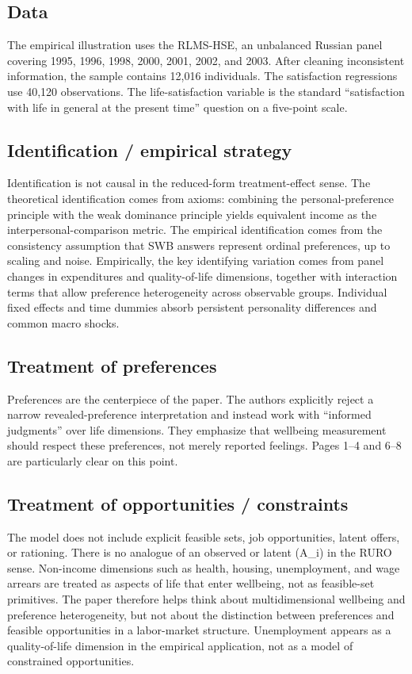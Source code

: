 \documentclass[11pt,a4paper]{article}
\begin{document}
\subsection*{Data}
The empirical illustration uses the RLMS-HSE, an unbalanced Russian panel covering 1995, 1996, 1998, 2000, 2001, 2002, and 2003. After cleaning inconsistent information, the sample contains 12,016 individuals. The satisfaction regressions use 40,120 observations. The life-satisfaction variable is the standard “satisfaction with life in general at the present time” question on a five-point scale.

\subsection*{Identification / empirical strategy}
Identification is not causal in the reduced-form treatment-effect sense. The theoretical identification comes from axioms: combining the personal-preference principle with the weak dominance principle yields equivalent income as the interpersonal-comparison metric. The empirical identification comes from the consistency assumption that SWB answers represent ordinal preferences, up to scaling and noise. Empirically, the key identifying variation comes from panel changes in expenditures and quality-of-life dimensions, together with interaction terms that allow preference heterogeneity across observable groups. Individual fixed effects and time dummies absorb persistent personality differences and common macro shocks.

\subsection*{Treatment of preferences}
Preferences are the centerpiece of the paper. The authors explicitly reject a narrow revealed-preference interpretation and instead work with “informed judgments” over life dimensions. They emphasize that wellbeing measurement should respect these preferences, not merely reported feelings. Pages 1–4 and 6–8 are particularly clear on this point.

\subsection*{Treatment of opportunities / constraints}
The model does not include explicit feasible sets, job opportunities, latent offers, or rationing. There is no analogue of an observed or latent (A\_i) in the RURO sense. Non-income dimensions such as health, housing, unemployment, and wage arrears are treated as aspects of life that enter wellbeing, not as feasible-set primitives. The paper therefore helps think about multidimensional wellbeing and preference heterogeneity, but not about the distinction between preferences and feasible opportunities in a labor-market structure. Unemployment appears as a quality-of-life dimension in the empirical application, not as a model of constrained opportunities.
\end{document}
